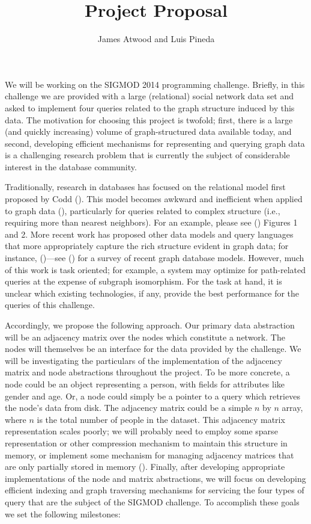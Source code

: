 \documentclass{article}
\title{Project Proposal}
\author{
James Atwood and Luis Pineda \\ %
}
\begin{document}
\maketitle

We will be working on the SIGMOD 2014 programming challenge.  Briefly, in this challenge we are provided with a large (relational) social network data set and asked to implement four queries related to the graph structure induced by this data.  The motivation for choosing this project is twofold; first, there is a large (and quickly increasing) volume of graph-structured data available today, and second, developing efficient mechanisms for representing and querying graph data is a challenging research problem that is currently the subject of considerable interest in the database community.

Traditionally, research in databases has focused on the relational model first proposed by Codd  (\cite{codd1970relational}).  This model becomes awkward and inefficient when applied to graph data (\cite{rodriguez2011graph}), particularly for queries related to complex structure (i.e., requiring more than nearest neighbors).  For an example, please see (\cite{he2008graphs}) Figures 1 and 2.  More recent work has proposed other data models and query languages that more appropriately capture the rich structure evident in graph data; for instance, (\cite{he2008graphs,sun2012efficient,low2010graphlab})---see (\cite{angles2008survey}) for a survey of recent graph database models.  However, much of this work is task oriented; for example, a system may optimize for path-related queries at the expense of subgraph isomorphism.  For the task at hand, it is unclear which existing technologies, if any, provide the best performance for the queries of this challenge.

Accordingly, we propose the following approach.  Our primary data abstraction will be an adjacency matrix over the nodes which constitute a network.  The nodes will themselves be an interface for the data provided by the challenge.  We will be investigating the particulars of the implementation of the adjacency matrix and node abstractions throughout the project. To be more concrete, a node could be an object representing a person, with fields for attributes like gender and age.  Or, a node could simply be a pointer to a query which retrieves the node's data from disk.  The adjacency matrix could be a simple $n$ by $n$ array, where $n$ is the total number of people in the dataset.  This adjacency matrix representation scales poorly; we will probably need to employ some sparse representation or other compression mechanism to maintain this structure in memory, or implement some mechanism for managing adjacency matrices that are only partially stored in memory (\cite{wang2004scalable}). Finally, after developing appropriate  implementations of the node and matrix abstractions, we will focus on developing efficient indexing and graph traversing mechanisms for servicing the four types of query that are the subject of the SIGMOD challenge. To accomplish these goals we set the following milestones:
\end{document}

